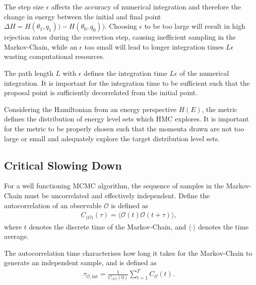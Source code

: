 \documentclass[11pt]{article}
\begin{document}
    The step size $\epsilon$ affects the accuracy of numerical integration and therefore the change in energy between the initial
    and final point $\Delta H = H(\theta_1, q_1)) - H(\theta_0, q_0))$.
    Choosing $\epsilon$ to be too large will result in high rejection rates during the correction step, causing
    inefficient sampling in the Markov-Chain, while an $\epsilon$ too small will lead to longer integration
    times $L\epsilon$ wasting computational resources.

    The path length $L$ with $\epsilon$ defines the integration time $L\epsilon$ of the numerical integration.
    It is important for the integration time to be sufficient such that the proposal point is sufficiently decorrelated
    from the initial point.

    Considering the Hamiltonian from an energy perspective $H(E)$, the metric defines the distribution of energy level
    sets which HMC explores.
    It is important for the metric to be properly chosen such that the momenta drawn are not too large or small and
    adequately explore the target distribution level sets.

\subsection{Critical Slowing Down}\label{subsec:critical_slowing}
    For a well functioning MCMC algorithm, the sequence of samples in the Markov-Chain must be uncorrelated and
    effectively independent.
    Define the autocorrelation of an observable $\mathcal{O}$ is defined as
    \begin{equation}\label{eq:autocorrelation}
    \begin{aligned}
        C_{\mathcal(O)}(\tau) = \langle \mathcal{O}(t) \mathcal{O}(t + \tau) \rangle,
    \end{aligned}
    \end{equation}
    where $t$ denotes the discrete time of the Markov-Chain, and $\langle \cdot \rangle$ denotes the time average.

    The autocorrelation time characterises how long it takes for the Markov-Chain to generate an independent sample,
    and is defined as
    \begin{equation}\label{eq:autocorrelation_time}
    \begin{aligned}
        \tau_{\mathcal{O}, \text{int}} = \frac{1}{C_{\mathcal(O)}(0)} \sum_{t=1}^T C_{\mathcal{O}}(t).
    \end{aligned}
    \end{equation}
\end{document}
